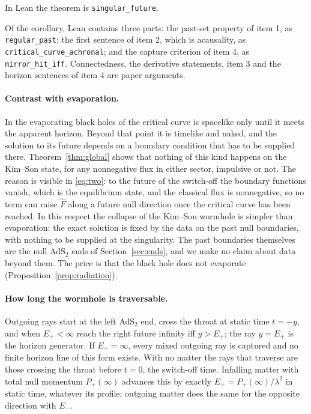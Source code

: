 \documentclass[11pt]{article}
\theoremstyle{remark}
\newcommand{\Fh}{\widehat F}
\newcommand{\lean}[1]{\texttt{#1}}
\begin{document}
In Lean the theorem is \lean{singular\_future}. {\sloppy Of the corollary, Lean contains three parts: the past-set property of item 1, as \lean{regular\_past}; the first sentence of item 2, which is acausality, as \lean{critical\_curve\_achronal}; and the capture criterion of item 4, as \lean{mirror\_hit\_iff}. Connectedness, the derivative statements, item 3 and the horizon sentences of item 4 are paper arguments.\par}

\paragraph{Contrast with evaporation.} In the evaporating black holes of \cite{RST} the critical curve is spacelike only until it meets the apparent horizon. Beyond that point it is timelike and naked, and the solution to its future depends on a boundary condition that has to be supplied there. Theorem~\ref{thm:global} shows that nothing of this kind happens on the Kim--Son state, for any nonnegative flux in either sector, impulsive or not. The reason is visible in \eqref{eq:two}: to the future of the switch-off the boundary functions vanish, which is the equilibrium state, and the classical flux is nonnegative, so no term can raise $\Fh$ along a future null direction once the critical curve has been reached. In this respect the collapse of the Kim--Son wormhole is simpler than evaporation: the exact solution is fixed by the data on the past null boundaries, with nothing to be supplied at the singularity. The past boundaries themselves are the null AdS$_2$ ends of Section~\ref{sec:ends}, and we make no claim about data beyond them. The price is that the black hole does not evaporate (Proposition~\ref{prop:radiation}).

\paragraph{How long the wormhole is traversable.} Outgoing rays start at the left AdS$_2$ end, cross the throat at static time $t=-y$, and when $E_+<\infty$ reach the right future infinity iff $y>E_+$; the ray $y=E_+$ is the horizon generator. If $E_+=\infty$, every mixed outgoing ray is captured and no finite horizon line of this form exists. With no matter the rays that traverse are those crossing the throat before $t=0$, the switch-off time. Infalling matter with total null momentum $P_+(\infty)$ advances this by exactly $E_+=P_+(\infty)/\lambda^2$ in static time, whatever its profile; outgoing matter does the same for the opposite direction with $E_-$.
\end{document}
